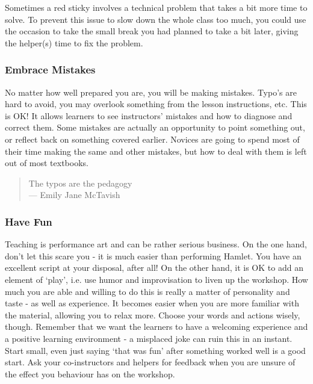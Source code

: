 Sometimes a red sticky involves a technical problem that takes a bit
more time to solve. To prevent this issue to slow down the whole class
too much, you could use the occasion to take the small break you had
planned to take a bit later, giving the helper(s) time to fix the
problem.

\subsubsection{Embrace Mistakes}\label{embrace-mistakes}

No matter how well prepared you are, you will be making mistakes. Typo's
are hard to avoid, you may overlook something from the lesson
instructions, etc. This is OK! It allows learners to see instructors'
mistakes and how to diagnose and correct them. Some mistakes are
actually an opportunity to point something out, or reflect back on
something covered earlier. Novices are going to spend most of their time
making the same and other mistakes, but how to deal with them is left
out of most textbooks.

\begin{quote}
The typos are the pedagogy\\--- Emily Jane McTavish
\end{quote}

\subsubsection{Have Fun}\label{have-fun}

Teaching is performance art and can be rather serious business. On the
one hand, don't let this scare you - it is much easier than performing
Hamlet. You have an excellent script at your disposal, after all! On the
other hand, it is OK to add an element of `play', i.e. use humor and
improvisation to liven up the workshop. How much you are able and
willing to do this is really a matter of personality and taste - as well
as experience. It becomes easier when you are more familiar with the
material, allowing you to relax more. Choose your words and actions
wisely, though. Remember that we want the learners to have a welcoming
experience and a positive learning environment - a misplaced joke can
ruin this in an instant. Start small, even just saying `that was fun'
after something worked well is a good start. Ask your co-instructors and
helpers for feedback when you are unsure of the effect you behaviour has
on the workshop.

